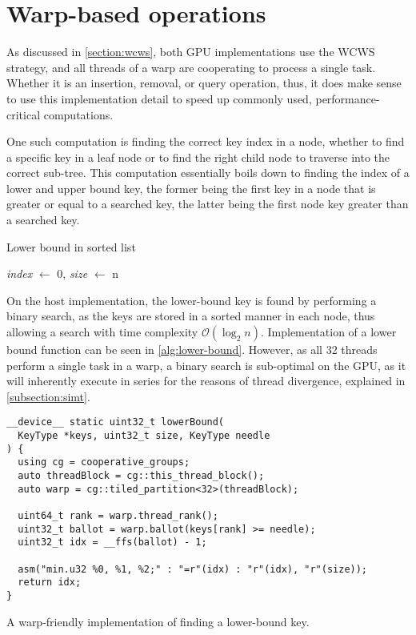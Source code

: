 \section{Warp-based operations}

As discussed in \cref{section:wcws}, both GPU implementations use the WCWS strategy, and all threads of a warp are cooperating to process a single task. Whether it is an insertion, removal, or query operation, thus, it does make sense to use this implementation detail to speed up commonly used, performance-critical computations.

One such computation is finding the correct key index in a node, whether to find a specific key in a leaf node or to find the right child node to traverse into the correct sub-tree. This computation essentially boils down to finding the index of a lower and upper bound key, the former being the first key in a node that is greater or equal to a searched key, the latter being the first node key greater than a searched key.

\begin{algorithm}
  \caption{Lower bound in sorted list}\label{alg:lower-bound}
  \DontPrintSemicolon


  \textit{index} $\gets$ 0, \textit{size} $\gets$ n\;
  \;
\end{algorithm}

On the host implementation, the lower-bound key is found by performing a binary search, as the keys are stored in a sorted manner in each node, thus allowing a search with time complexity $\mathcal{O}(\log_2 n)$. Implementation of a lower bound function can be seen in \cref{alg:lower-bound}. However, as all 32 threads perform a single task in a warp, a binary search is sub-optimal on the GPU, as it will inherently execute in series for the reasons of thread divergence, explained in \cref{subsection:simt}.

\begin{listing}
  \begin{verbatim}
__device__ static uint32_t lowerBound(
  KeyType *keys, uint32_t size, KeyType needle
) {
  using cg = cooperative_groups;
  auto threadBlock = cg::this_thread_block();
  auto warp = cg::tiled_partition<32>(threadBlock);

  uint64_t rank = warp.thread_rank();
  uint32_t ballot = warp.ballot(keys[rank] >= needle);
  uint32_t idx = __ffs(ballot) - 1;

  asm("min.u32 %0, %1, %2;" : "=r"(idx) : "r"(idx), "r"(size));
  return idx;
}
  \end{verbatim}
  \caption{A warp-friendly implementation of finding a lower-bound key.}
  \label{lst:lower-bound-cuda}
\end{listing}

